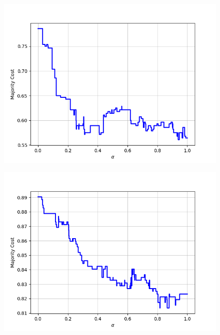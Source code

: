 \begin{figure}[H]
\begin{minipage}{.24\textwidth}
  {\includegraphics[width=\linewidth]{plots/omniglot-intra-ac/Bengali}}
\end{minipage}
\begin{minipage}{.24\textwidth}
  \centering
  {\includegraphics[width=\linewidth]{plots/omniglot-intra-ac/Blackfoot_(Canadian_Aboriginal_Syllabics)}}
\end{minipage}
\begin{minipage}{.24\textwidth}
  \centering

\end{minipage}
\end{figure}
